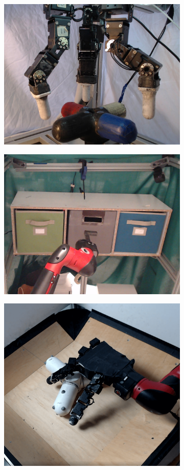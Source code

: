 \documentclass[conference]{IEEEtran}
\begin{document}
\begin{figure}[t]
    \centering
    \begin{subfigure}[b]{0.32\textwidth}
        \includegraphics[height=0.6\textwidth]{figures/robot/dclaw_new.jpg}
    \end{subfigure}
    \begin{subfigure}[b]{0.32\textwidth}
        \center
        \includegraphics[height=0.6\textwidth]{figures/robot/drawer_img.jpeg}
    \end{subfigure}
    \begin{subfigure}[b]{0.32\textwidth}
        \center
        \includegraphics[height=0.6\textwidth]{figures/robot/hand.png}

\end{subfigure}
\end{figure}
\end{document}
